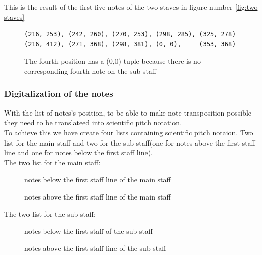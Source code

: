 \documentclass[a4paper,12pt]{report}
\begin{document}
\noindent This is the result of the first five notes of the two staves in figure number
\ref{fig:two staves}\\

\begin{figure}[H]
\begin{verbatim}
(216, 253), (242, 260), (270, 253), (298, 285), (325, 278)
(216, 412), (271, 368), (298, 381), (0, 0),     (353, 368)
\end{verbatim}
\caption{The fourth position has a (0,0) tuple because there is no corresponding fourth
note on the sub staff}
\end{figure}

\subsubsection{Digitalization of the notes}
With the list of notes's position, to be able to make note transposition possible
they need to be translateed into scientific pitch notation.\\

To achieve this we have create four lists containing scientific pitch notaion.
Two list for the main staff and two for the sub staff(one for notes above the
first staff line and one for notes below the first staff line).\\

The two list for the main staff:
\begin{figure}[h]
\centering
\makebox[\textwidth]{['E5','D5','C5','B4','A4','G4','F4','E4','D4','C4','B3','A3','G3','F3','E3','D3','C3']}
\caption{notes below the first staff line of the main staff}
\vspace{\baselineskip}
\makebox[\textwidth]{['E5','F5','G5','A5','B5','C6','D6','E6','F6','G6']}
\caption{notes above the first staff line of the main staff}
\end{figure}

\vspace{\baselineskip}
The two list for the sub staff:
\begin{figure}[h]
\centering
\makebox[\textwidth]{['G3','F3','E3','D3','C3','B2','A2','G2','F2','E2','D2','C2','B1','A1','G1','F1','E1']}
\caption{notes below the first staff of the sub staff}
\vspace{\baselineskip}
\makebox[\textwidth]{['G3','A3','B3','C4','D4','E4','F4','G4','A4','B4']}
\caption{notes above the first staff line of the sub staff}
\end{figure}
\end{document}
